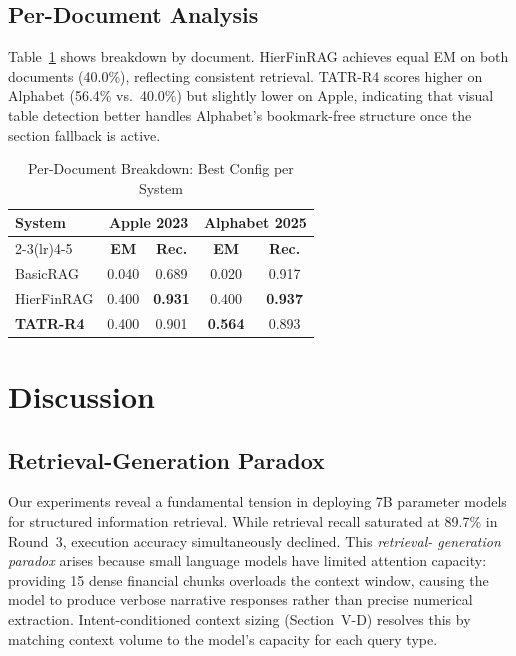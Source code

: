 \documentclass[conference]{IEEEtran}
\newcommand{\best}[1]{\textbf{#1}}
\begin{document}
\subsection{Per-Document Analysis}

Table~\ref{tab:perdoc} shows breakdown by document. HierFinRAG achieves equal
EM on both documents (40.0\%), reflecting consistent retrieval. TATR-R4 scores
higher on Alphabet (56.4\% vs.\ 40.0\%) but slightly lower on Apple,
indicating that visual table detection better handles Alphabet's bookmark-free
structure once the section fallback is active.

\begin{table}[htbp]
\caption{Per-Document Breakdown: Best Config per System}
\label{tab:perdoc}
\centering
\renewcommand{\arraystretch}{1.2}
\begin{tabular}{l cc cc}
\toprule
\multirow{2}{*}{\textbf{System}} &
\multicolumn{2}{c}{\textbf{Apple 2023}} &
\multicolumn{2}{c}{\textbf{Alphabet 2025}} \\
\cmidrule(lr){2-3}\cmidrule(lr){4-5}
 & \textbf{EM} & \textbf{Rec.} & \textbf{EM} & \textbf{Rec.} \\
\midrule
BasicRAG    & 0.040 & 0.689 & 0.020 & 0.917 \\
HierFinRAG  & 0.400 & \best{0.931} & 0.400 & \best{0.937} \\
\rowcolor{bestrow}
\textbf{TATR-R4} & 0.400 & 0.901 & \best{0.564} & 0.893 \\
\bottomrule
\end{tabular}
\end{table}

\section{Discussion}

\subsection{Retrieval-Generation Paradox}
Our experiments reveal a fundamental tension in deploying 7B parameter models
for structured information retrieval. While retrieval recall saturated at 89.7\%
in Round~3, execution accuracy simultaneously declined. This \emph{retrieval-
generation paradox} arises because small language models have limited attention
capacity: providing 15 dense financial chunks overloads the context window,
causing the model to produce verbose narrative responses rather than precise
numerical extraction. Intent-conditioned context sizing (Section~V-D) resolves
this by matching context volume to the model's capacity for each query type.
\end{document}
